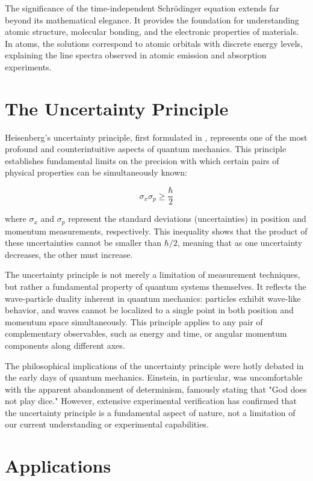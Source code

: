 \documentclass[11pt,a4paper]{article}
\begin{document}
The significance of the time-independent Schrödinger equation extends far beyond its mathematical elegance. It provides the foundation for understanding atomic structure, molecular bonding, and the electronic properties of materials. In atoms, the solutions correspond to atomic orbitals with discrete energy levels, explaining the line spectra observed in atomic emission and absorption experiments.

\section{The Uncertainty Principle}

Heisenberg's uncertainty principle, first formulated in \cite{heisenberg1927}, represents one of the most profound and counterintuitive aspects of quantum mechanics. This principle establishes fundamental limits on the precision with which certain pairs of physical properties can be simultaneously known:

\begin{equation}
\sigma_x \sigma_p \geq \frac{\hbar}{2}
\end{equation}

where $\sigma_x$ and $\sigma_p$ represent the standard deviations (uncertainties) in position and momentum measurements, respectively. This inequality shows that the product of these uncertainties cannot be smaller than $\hbar/2$, meaning that as one uncertainty decreases, the other must increase.

The uncertainty principle is not merely a limitation of measurement techniques, but rather a fundamental property of quantum systems themselves. It reflects the wave-particle duality inherent in quantum mechanics: particles exhibit wave-like behavior, and waves cannot be localized to a single point in both position and momentum space simultaneously. This principle applies to any pair of complementary observables, such as energy and time, or angular momentum components along different axes.

The philosophical implications of the uncertainty principle were hotly debated in the early days of quantum mechanics. Einstein, in particular, was uncomfortable with the apparent abandonment of determinism, famously stating that "God does not play dice." However, extensive experimental verification has confirmed that the uncertainty principle is a fundamental aspect of nature, not a limitation of our current understanding or experimental capabilities.

\section{Applications}
\end{document}
